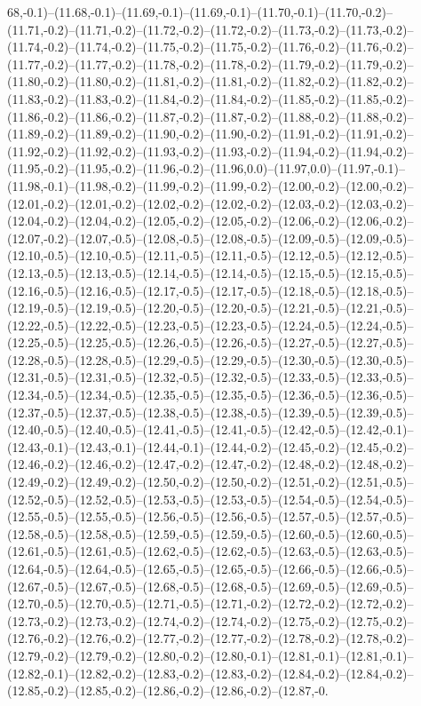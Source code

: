 68,-0.1)--(11.68,-0.1)--(11.69,-0.1)--(11.69,-0.1)--(11.70,-0.1)--(11.70,-0.2)--(11.71,-0.2)--(11.71,-0.2)--(11.72,-0.2)--(11.72,-0.2)--(11.73,-0.2)--(11.73,-0.2)--(11.74,-0.2)--(11.74,-0.2)--(11.75,-0.2)--(11.75,-0.2)--(11.76,-0.2)--(11.76,-0.2)--(11.77,-0.2)--(11.77,-0.2)--(11.78,-0.2)--(11.78,-0.2)--(11.79,-0.2)--(11.79,-0.2)--(11.80,-0.2)--(11.80,-0.2)--(11.81,-0.2)--(11.81,-0.2)--(11.82,-0.2)--(11.82,-0.2)--(11.83,-0.2)--(11.83,-0.2)--(11.84,-0.2)--(11.84,-0.2)--(11.85,-0.2)--(11.85,-0.2)--(11.86,-0.2)--(11.86,-0.2)--(11.87,-0.2)--(11.87,-0.2)--(11.88,-0.2)--(11.88,-0.2)--(11.89,-0.2)--(11.89,-0.2)--(11.90,-0.2)--(11.90,-0.2)--(11.91,-0.2)--(11.91,-0.2)--(11.92,-0.2)--(11.92,-0.2)--(11.93,-0.2)--(11.93,-0.2)--(11.94,-0.2)--(11.94,-0.2)--(11.95,-0.2)--(11.95,-0.2)--(11.96,-0.2)--(11.96,0.0)--(11.97,0.0)--(11.97,-0.1)--(11.98,-0.1)--(11.98,-0.2)--(11.99,-0.2)--(11.99,-0.2)--(12.00,-0.2)--(12.00,-0.2)--(12.01,-0.2)--(12.01,-0.2)--(12.02,-0.2)--(12.02,-0.2)--(12.03,-0.2)--(12.03,-0.2)--(12.04,-0.2)--(12.04,-0.2)--(12.05,-0.2)--(12.05,-0.2)--(12.06,-0.2)--(12.06,-0.2)--(12.07,-0.2)--(12.07,-0.5)--(12.08,-0.5)--(12.08,-0.5)--(12.09,-0.5)--(12.09,-0.5)--(12.10,-0.5)--(12.10,-0.5)--(12.11,-0.5)--(12.11,-0.5)--(12.12,-0.5)--(12.12,-0.5)--(12.13,-0.5)--(12.13,-0.5)--(12.14,-0.5)--(12.14,-0.5)--(12.15,-0.5)--(12.15,-0.5)--(12.16,-0.5)--(12.16,-0.5)--(12.17,-0.5)--(12.17,-0.5)--(12.18,-0.5)--(12.18,-0.5)--(12.19,-0.5)--(12.19,-0.5)--(12.20,-0.5)--(12.20,-0.5)--(12.21,-0.5)--(12.21,-0.5)--(12.22,-0.5)--(12.22,-0.5)--(12.23,-0.5)--(12.23,-0.5)--(12.24,-0.5)--(12.24,-0.5)--(12.25,-0.5)--(12.25,-0.5)--(12.26,-0.5)--(12.26,-0.5)--(12.27,-0.5)--(12.27,-0.5)--(12.28,-0.5)--(12.28,-0.5)--(12.29,-0.5)--(12.29,-0.5)--(12.30,-0.5)--(12.30,-0.5)--(12.31,-0.5)--(12.31,-0.5)--(12.32,-0.5)--(12.32,-0.5)--(12.33,-0.5)--(12.33,-0.5)--(12.34,-0.5)--(12.34,-0.5)--(12.35,-0.5)--(12.35,-0.5)--(12.36,-0.5)--(12.36,-0.5)--(12.37,-0.5)--(12.37,-0.5)--(12.38,-0.5)--(12.38,-0.5)--(12.39,-0.5)--(12.39,-0.5)--(12.40,-0.5)--(12.40,-0.5)--(12.41,-0.5)--(12.41,-0.5)--(12.42,-0.5)--(12.42,-0.1)--(12.43,-0.1)--(12.43,-0.1)--(12.44,-0.1)--(12.44,-0.2)--(12.45,-0.2)--(12.45,-0.2)--(12.46,-0.2)--(12.46,-0.2)--(12.47,-0.2)--(12.47,-0.2)--(12.48,-0.2)--(12.48,-0.2)--(12.49,-0.2)--(12.49,-0.2)--(12.50,-0.2)--(12.50,-0.2)--(12.51,-0.2)--(12.51,-0.5)--(12.52,-0.5)--(12.52,-0.5)--(12.53,-0.5)--(12.53,-0.5)--(12.54,-0.5)--(12.54,-0.5)--(12.55,-0.5)--(12.55,-0.5)--(12.56,-0.5)--(12.56,-0.5)--(12.57,-0.5)--(12.57,-0.5)--(12.58,-0.5)--(12.58,-0.5)--(12.59,-0.5)--(12.59,-0.5)--(12.60,-0.5)--(12.60,-0.5)--(12.61,-0.5)--(12.61,-0.5)--(12.62,-0.5)--(12.62,-0.5)--(12.63,-0.5)--(12.63,-0.5)--(12.64,-0.5)--(12.64,-0.5)--(12.65,-0.5)--(12.65,-0.5)--(12.66,-0.5)--(12.66,-0.5)--(12.67,-0.5)--(12.67,-0.5)--(12.68,-0.5)--(12.68,-0.5)--(12.69,-0.5)--(12.69,-0.5)--(12.70,-0.5)--(12.70,-0.5)--(12.71,-0.5)--(12.71,-0.2)--(12.72,-0.2)--(12.72,-0.2)--(12.73,-0.2)--(12.73,-0.2)--(12.74,-0.2)--(12.74,-0.2)--(12.75,-0.2)--(12.75,-0.2)--(12.76,-0.2)--(12.76,-0.2)--(12.77,-0.2)--(12.77,-0.2)--(12.78,-0.2)--(12.78,-0.2)--(12.79,-0.2)--(12.79,-0.2)--(12.80,-0.2)--(12.80,-0.1)--(12.81,-0.1)--(12.81,-0.1)--(12.82,-0.1)--(12.82,-0.2)--(12.83,-0.2)--(12.83,-0.2)--(12.84,-0.2)--(12.84,-0.2)--(12.85,-0.2)--(12.85,-0.2)--(12.86,-0.2)--(12.86,-0.2)--(12.87,-0.